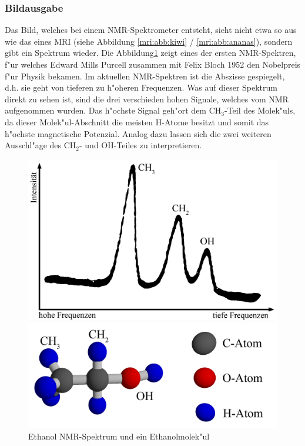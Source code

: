 \subsubsection{Bildausgabe}
Das Bild, welches bei einem NMR-Spektrometer entsteht, sieht nicht etwa so aus wie das eines MRI (siehe Abbildung \ref{mri:abb:kiwi} / \ref{mri:abb:ananas}), sondern gibt ein Spektrum wieder. Die Abbildung\;\ref{mri:bsp:abb:Etanolspektrum} zeigt eines der ersten NMR-Spektren, f"ur welches Edward Mills Purcell zusammen mit Felix Bloch 1952 den Nobelpreis f"ur Physik bekamen. Im aktuellen NMR-Spektren ist die Abszisse gespiegelt, d.h. sie geht von tieferen zu h"oheren Frequenzen. Was auf dieser Spektrum direkt zu sehen ist, sind die drei verschieden hohen Signale, welches vom NMR aufgenommen wurden. Das h"ochste Signal geh"ort dem $\mathrm{CH_3}$-Teil des Molek"uls, da dieser Molek"ul-Abschnitt die meisten H-Atome besitzt und somit das h"ochste magnetische Potenzial. Analog dazu lassen sich die zwei weiteren Ausschl"age des $\mathrm{CH_2}$- und OH-Teiles zu interpretieren. 
\begin{figure}
	\centering
	\begin{minipage}{0.55\textwidth}
		\includegraphics[width = \textwidth]{./mri/pic/CW_SpektrumEthanol.png}
	\end{minipage}
	\begin{minipage}{0.42\textwidth}
		\includegraphics[width = \textwidth]{./mri/pic/Ethanol.png}
	\end{minipage}
	\caption{Ethanol NMR-Spektrum \cite{skript:mri:NMRSkopie} und ein Ethanolmolek"ul}
	\label{mri:bsp:abb:Etanolspektrum}
\end{figure}
